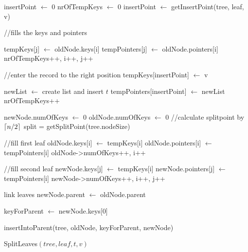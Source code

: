 \documentclass[abstracton,12pt,oneside]{scrreprt}
\DeclarePairedDelimiter\ceil{\lceil}{\rceil}
\begin{document}
\begin{algorithm}[H]
	\IncMargin{1em}
	\SetAlgoLined
	\DontPrintSemicolon
	
	
	
	insertPoint $\leftarrow$ 0\;
	nrOfTempKeys $\leftarrow$ 0\;
	insertPoint $\leftarrow$ getInsertPoint(tree, leaf, v)\;
	
	//fills the keys and pointers\;
	 {
		
		tempKeys[j] $\leftarrow$ oldNode.keys[i]\;
		tempPointers[j] $\leftarrow$ oldNode.pointers[i]\;
		nrOfTempKeys++, i++, j++\;
	}
	
	//enter the record to the right position\;
	tempKeys[insertPoint] $\leftarrow$ v\;
	
	newList $\leftarrow$ create list and insert $t$\;
	tempPointers[insertPoint] $\leftarrow$ newList\;
	nrOfTempKeys++\;
	
	newNode.numOfKeys $\leftarrow$ 0\;
	oldNode.numOfKeys $\leftarrow$ 0\;
	\BlankLine
	//calculate splitpoint by $\ceil{n/2}$\;
	split = getSplitPoint(tree.nodeSize)\;
	
	//fill first leaf\;
	 {
		oldNode.keys[i] $\leftarrow$ tempKeys[i]\;
		oldNode.pointers[i] $\leftarrow$ tempPointers[i]\;
		oldNode->numOfKeys++, i++\;
	}
	
	
	//fill second leaf\;
	 {
		newNode.keys[j] $\leftarrow$ tempKeys[i]\;
		newNode.pointers[j] $\leftarrow$ tempPointers[i]\;
		newNode->numOfKeys++, i++, j++\;
	}
	
	link leaves\;
	newNode.parent $\leftarrow$ oldNode.parent\;
	
	keyForParent $\leftarrow$ newNode.keys[0]\;
	
	insertIntoParent(tree, oldNode, keyForParent, newNode)\;
	
	
	
	
	\caption{SplitLeaves$(tree, leaf, t, v)$}	\label{SplitLeaves}
\end{algorithm}
\end{document}
